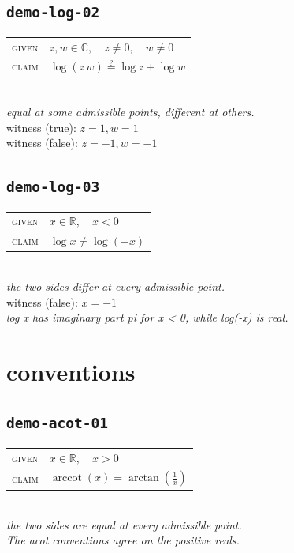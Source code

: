 \documentclass[11pt]{article}
\begin{document}
\subsection*{\texttt{demo-log-02}}
\begin{tabular}{@{}l@{\quad}l@{}}
\textsc{given} & $z, w \in \mathbb{C},\quad z \neq 0,\quad w \neq 0$ \\[4pt]
\textsc{claim} & $\displaystyle \log\left(z \, w\right) \overset{?}{=} \log z + \log w$ \\
\end{tabular}\\[2pt]
{\small\emph{equal at some admissible points, different at others.}}\\
{\footnotesize\color{gray}witness (true): $z = 1, w = 1$}\\
{\footnotesize\color{gray}witness (false): $z = -1, w = -1$}\\

\subsection*{\texttt{demo-log-03}}
\begin{tabular}{@{}l@{\quad}l@{}}
\textsc{given} & $x \in \mathbb{R},\quad x < 0$ \\[4pt]
\textsc{claim} & $\displaystyle \log x \neq \log\left(-x\right)$ \\
\end{tabular}\\[2pt]
{\small\emph{the two sides differ at every admissible point.}}\\
{\footnotesize\color{gray}witness (false): $x = -1$}\\
\emph{log x has imaginary part pi for x < 0, while log(-x) is real.}\\

\section*{conventions}
\subsection*{\texttt{demo-acot-01}}
\begin{tabular}{@{}l@{\quad}l@{}}
\textsc{given} & $x \in \mathbb{R},\quad x > 0$ \\[4pt]
\textsc{claim} & $\displaystyle \operatorname{arccot}\left(x\right) = \arctan\left(\frac{1}{x}\right)$ \\
\end{tabular}\\[2pt]
{\small\emph{the two sides are equal at every admissible point.}}\\
\emph{The acot conventions agree on the positive reals.}\\
\end{document}
